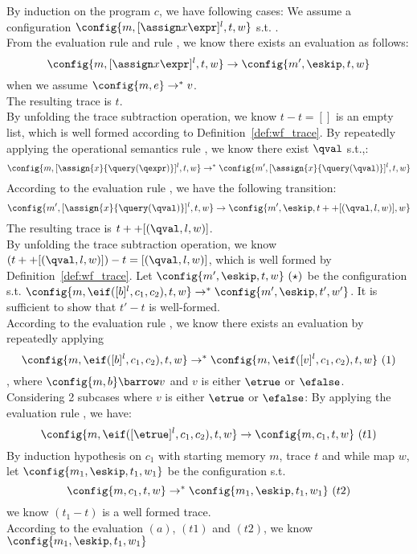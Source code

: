 {
By induction on the program $c$, we have following cases:
%
%
We assume a configuration $\config{m,[\assign x \expr]^{l} , t, w}$ s.t. .
\\
From the evaluation rule  and rule , we know there exists an evaluation as follows:
%
\[
	\config{m, [\assign x \expr]^{l}, t, w} \to \config{m', \eskip, t, w}
\]
%
when we assume $\config{m,e} \to^{*} v$. 
%
\\
The resulting trace is $t$. 
\\
By unfolding the trace subtraction operation, we know $t - t = []$ is an empty list, which is well formed according to Definition~\ref{def:wf_trace}.
}
By repeatedly applying the operational semantics rule , we know there exist $\qval$ s.t.,:
%
\[
\config{m, [\assign{x}{\query(\qexpr)}]^{l}, t, w} \to^{*} \config{m', [\assign{x}{\query(\qval)}]^{l}, t, w}
\]
%
According to the evaluation rule , we have the following transition:
\[
	\config{m', [\assign{x}{\query(\qval)}]^{l}, t, w} \to \config{m', \eskip, t ++ [(\qval, l, w)], w}
\]
%
The resulting trace is $t ++ [(\qval, l, w)]$.
\\
By unfolding the trace subtraction operation, we know $(t ++ [(\qval, l, w)]) - t = [(\qval, l, w)]$,
which is well formed by Definition~\ref{def:wf_trace}.
Let $\config{m', \eskip, t, w} ~ (\star)$ be the configuration 
s.t. $\config{m, \eif([b]^l, c_1, c_2), t, w} \to^{*} \config{m', \eskip, t', w'}$.
It is sufficient to show that $t' - t$ is well-formed.
\\
According to the evaluation rule , we know there exists an evaluation by repeatedly applying  
%
\[
\config{m, \eif([b]^l, c_1, c_2), t, w} \to^{*} \config{m, \eif([v]^l, c_1, c_2), t, w} ~ (1)
\]
%
, where $\config{m, b} \barrow v$ and $v$ is either $\etrue$ or $\efalse$.
\\
Considering 2 subcases where $v$ is either $\etrue$ or $\efalse$:
%
%
By applying the evaluation rule , we have:
\[
\config{m, \eif([\etrue]^l, c_1, c_2), t, w} \to \config{m, c_1, t, w} ~ (t1)
\]
%
By induction hypothesis on $c_1$ with starting memory $m$, trace $t$ and while map $w$, 
let $\config{m_1, \eskip, t_1, w_1}$ be the configuration s.t.
\[
	\config{m, c_1, t, w} \to^{*} \config{m_1, \eskip, t_1, w_1} ~(t2)
\]
we know $(t_1 - t)$ is a well formed trace.
\\
According to the evaluation $(a)$, $(t1)$ and $(t2)$, we know $\config{m_1, \eskip, t_1, w_1}$ 
